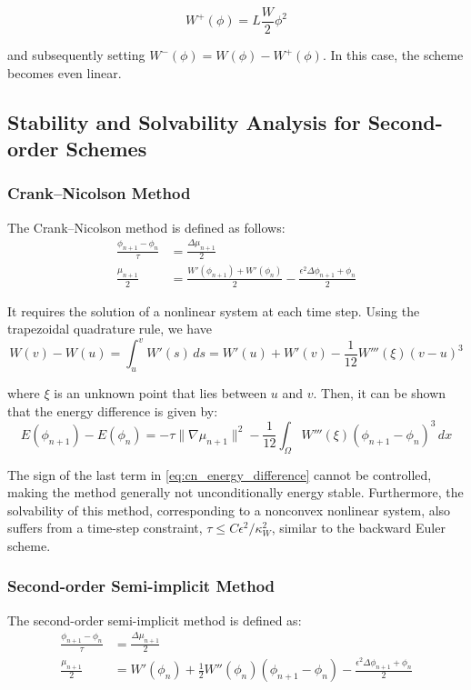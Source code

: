 \documentclass{article}
\begin{document}
\begin{equation}
W^+(\phi) = L\frac{W}{2}\phi^2
\end{equation}

and subsequently setting $W^-(\phi) = W(\phi) - W^+(\phi)$. In this case, the scheme becomes even linear. 



\subsection{Stability and Solvability Analysis for Second-order Schemes}

\subsubsection{Crank–Nicolson Method}
The Crank–Nicolson method is defined as follows:
\begin{align}
    \frac{\phi_{n+1} - \phi_n}{\tau} &= \frac{\Delta \mu_{n+1}}{2} \label{eq:cn_phi} \\
    \frac{\mu_{n+1}}{2} &= \frac{W'(\phi_{n+1}) + W'(\phi_n)}{2} - \frac{\epsilon^2\Delta \phi_{n+1} + \phi_n}{2} \label{eq:cn_mu}
\end{align}

It requires the solution of a nonlinear system at each time step. Using the trapezoidal quadrature rule, we have
\begin{equation}
    W(v) - W(u) = \int_{u}^{v} W'(s) \, ds = W'(u) + W'(v) - \frac{1}{12}W'''(\xi)(v - u)^3 \label{eq:cn_trapezoidal}
\end{equation}

where $\xi$ is an unknown point that lies between $u$ and $v$. Then, it can be shown that the energy difference is given by:
\begin{equation}
    E(\phi_{n+1}) - E(\phi_n) = -\tau\|\nabla \mu_{n+1}\|^2 - \frac{1}{12}\int_{\Omega} W'''(\xi)(\phi_{n+1} - \phi_n)^3 \, dx \label{eq:cn_energy_difference}
\end{equation}

The sign of the last term in \eqref{eq:cn_energy_difference} cannot be controlled, making the method generally not unconditionally energy stable. Furthermore, the solvability of this method, corresponding to a nonconvex nonlinear system, also suffers from a time-step constraint, $\tau \leq C\epsilon^2/\kappa_W^2$, similar to the backward Euler scheme.

\subsubsection{Second-order Semi-implicit Method}
The second-order semi-implicit method is defined as:
\begin{align}
    \frac{\phi_{n+1} - \phi_n}{\tau} &= \frac{\Delta \mu_{n+1}}{2} \label{eq:second_order_semi_implicit_phi} \\
    \frac{\mu_{n+1}}{2} &= W'(\phi_n) + \frac{1}{2}W''(\phi_n)(\phi_{n+1} - \phi_n) - \frac{\epsilon^2\Delta \phi_{n+1} + \phi_n}{2} \label{eq:second_order_semi_implicit_mu}
\end{align}
\end{document}
